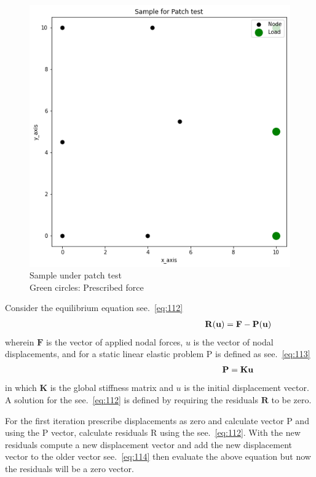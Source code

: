 \documentclass[fleqn, 12.5pt,a4paper]{report}
\begin{document}
\begin{figure}[h]
    \centering
    \includegraphics[scale =0.55]{Newton's.png}
    \caption{Sample under patch test\\ Green circles: Prescribed force}
    \label{fig:19}
\end{figure}

\hspace{-0.5cm}Consider the equilibrium equation see.~\autoref{eq:112}
\begin{align}\label{eq:112}\hspace{6.5cm}
\mathbf{R}(\mathbf{u})=\mathbf{F}-\mathbf{P}(\mathbf{u})
\end{align}
wherein $\mathbf{F}$ is the vector of applied nodal forces, $u$ is the vector of nodal displacements, and for a static linear elastic problem $\mathrm{P}$ is defined as see.~\autoref{eq:113}
\begin{align}\label{eq:113}\hspace{6.5cm}
\mathbf{P}=\mathbf{Ku}
\end{align}
in which $\mathbf{K}$ is the global stiffness matrix and $u$ is the initial displacement vector. A solution for the see.~\autoref{eq:112} is defined by requiring the residuals $\mathbf{R}$ to be zero. 

For the first iteration prescribe displacements as zero and calculate vector P and using the P vector, calculate residuals R using the see.~\autoref{eq:112}. With the new residuals compute a new displacement vector and add the new displacement vector to the older vector see.~\autoref{eq:114} then evaluate the above equation but now the residuals will be a zero vector.
\end{document}
